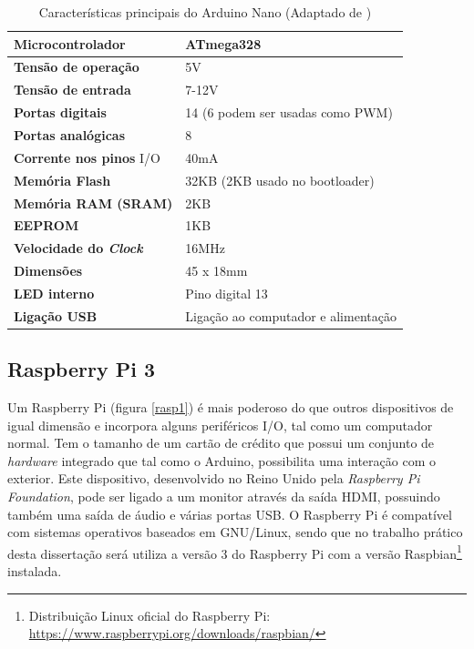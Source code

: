 \begin{table}[h]
	\centering
	
	\begin{tabular}{|
			>{\columncolor[HTML]{EFEFEF}}l |l|} \hline
		\textbf{Microcontrolador} & ATmega328 \\ \hline
		\textbf{Tensão de operação} & 5V \\ \hline
		\textbf{Tensão de entrada} & 7-12V \\ \hline
		\textbf{Portas digitais} & 14 (6 podem ser usadas como PWM) \\ \hline
		\textbf{Portas analógicas} & 8 \\ \hline
		\textbf{Corrente nos pinos} \ac{I/O} & 40mA \\ \hline
		\textbf{Memória Flash} & 32KB (2KB usado no bootloader) \\ \hline
		\textbf{Memória \acs{RAM} (SRAM)} & 2KB \\ \hline
		\textbf{EEPROM} & 1KB \\ \hline
		\textbf{Velocidade do \textit{Clock}} & 16MHz \\ \hline
		\textbf{Dimensões} & 45 x 18mm \\ \hline
		\textbf{\ac{LED} interno} & Pino digital 13 \\ \hline
		\textbf{Ligação \ac{USB}} & Ligação ao computador e alimentação \\ \hline
	\end{tabular}
	\caption[Características principais do Arduino Nano]{Características principais do Arduino Nano (Adaptado de \cite{Melorose2015})}
	\label{caraarduino}
\end{table}






\subsection{Raspberry Pi 3}

Um Raspberry Pi (figura \ref{rasp1}) é mais poderoso do que outros dispositivos de igual dimensão e incorpora alguns periféricos \ac{I/O}, tal como um computador normal. Tem o tamanho de um cartão de crédito que possui um conjunto de \textit{hardware} integrado que tal como o Arduino, possibilita uma interação com o exterior. Este dispositivo, desenvolvido no Reino Unido pela \textit{Raspberry Pi Foundation}, pode ser ligado a um monitor através da saída HDMI, possuindo também uma saída de áudio e várias portas \ac{USB}. O Raspberry Pi é compatível com sistemas operativos baseados em GNU/Linux, sendo que no trabalho prático desta dissertação será utiliza a versão 3 do Raspberry Pi com a versão Raspbian\footnote{Distribuição Linux oficial do Raspberry Pi:  \url{https://www.raspberrypi.org/downloads/raspbian/}} instalada\cite{RaspberryPiFoundation2012}.

